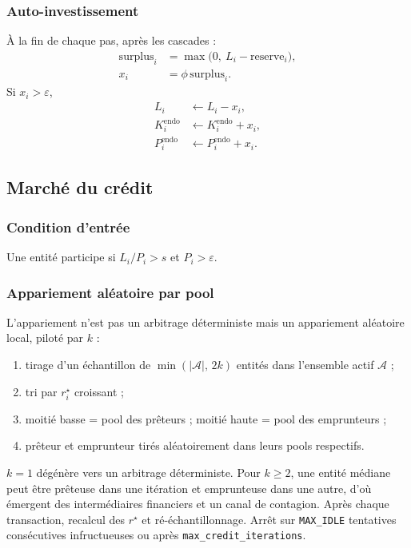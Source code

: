 \documentclass[10pt,a4paper]{article}
\begin{document}
\subsubsection{Auto-investissement}

À la fin de chaque pas, après les cascades :
\begin{align*}
\mathrm{surplus}_i &= \max\!\bigl(0,\ L_i - \mathrm{reserve}_i\bigr),\\
x_i &= \phi\,\mathrm{surplus}_i.
\end{align*}
Si \(x_i>\varepsilon\),
\begin{align*}
L_i &\leftarrow L_i - x_i,\\
K_i^{\mathrm{endo}} &\leftarrow K_i^{\mathrm{endo}} + x_i,\\
P_i^{\mathrm{endo}} &\leftarrow P_i^{\mathrm{endo}} + x_i.
\end{align*}

\subsection{Marché du crédit}

\subsubsection{Condition d'entrée}

Une entité participe si \(L_i/P_i > s\) et \(P_i>\varepsilon\).

\subsubsection{Appariement aléatoire par pool}

L'appariement n'est pas un arbitrage déterministe mais un appariement aléatoire local, piloté par \(k\) :
\begin{enumerate}
    \item tirage d'un échantillon de \(\min(|\mathcal A|,\,2k)\) entités dans l'ensemble actif \(\mathcal A\) ;
    \item tri par \(r_i^\star\) croissant ;
    \item moitié basse = pool des prêteurs ; moitié haute = pool des emprunteurs ;
    \item prêteur et emprunteur tirés aléatoirement dans leurs pools respectifs.
\end{enumerate}
\(k=1\) dégénère vers un arbitrage déterministe. Pour \(k\ge 2\), une entité médiane peut être prêteuse dans une itération et emprunteuse dans une autre, d'où émergent des intermédiaires financiers et un canal de contagion. Après chaque transaction, recalcul des \(r^\star\) et ré-échantillonnage. Arrêt sur \texttt{MAX\_IDLE} tentatives consécutives infructueuses ou après \texttt{max\_credit\_iterations}.
\end{document}
